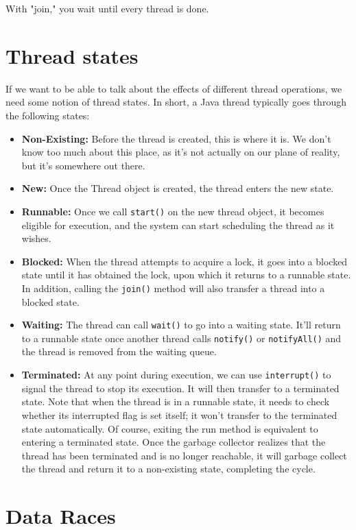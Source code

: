 \documentclass{article}
\begin{document}
With "join," you wait until every thread is done.

\section{Thread states}

If we want to be able to talk about the effects of different thread operations, we need some notion of thread states. In short, a Java thread typically goes through the following states:

\begin{itemize}
    \item \textbf{Non-Existing:} Before the thread is created, this is where it is. We don't know too much about this place, as it's not actually on our plane of reality, but it's somewhere out there.
    \item \textbf{New:} Once the Thread object is created, the thread enters the new state.
    \item \textbf{Runnable:} Once we call \texttt{start()} on the new thread object, it becomes eligible for execution, and the system can start scheduling the thread as it wishes.
    \item \textbf{Blocked:} When the thread attempts to acquire a lock, it goes into a blocked state until it has obtained the lock, upon which it returns to a runnable state. In addition, calling the \texttt{join()} method will also transfer a thread into a blocked state.
    \item \textbf{Waiting:} The thread can call \texttt{wait()} to go into a waiting state. It'll return to a runnable state once another thread calls \texttt{notify()} or \texttt{notifyAll()} and the thread is removed from the waiting queue.
    \item \textbf{Terminated:} At any point during execution, we can use \texttt{interrupt()} to signal the thread to stop its execution. It will then transfer to a terminated state. Note that when the thread is in a runnable state, it needs to check whether its interrupted flag is set itself; it won't transfer to the terminated state automatically. Of course, exiting the run method is equivalent to entering a terminated state. Once the garbage collector realizes that the thread has been terminated and is no longer reachable, it will garbage collect the thread and return it to a non-existing state, completing the cycle.
\end{itemize}

\section{Data Races}
\end{document}
